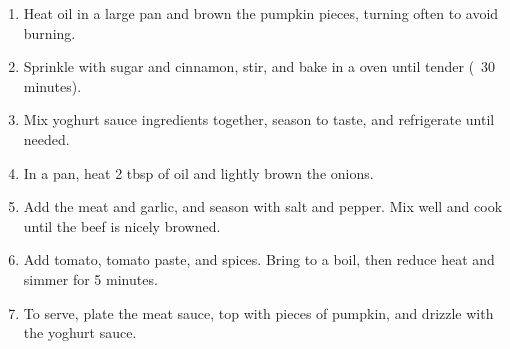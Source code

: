\begin{enumerate}
    \item Heat oil in a large pan and brown the pumpkin pieces, turning often to avoid burning.
    \item Sprinkle with sugar and cinnamon, stir, and bake in a  oven until tender (~30 minutes).
    \item Mix yoghurt sauce ingredients together, season to taste, and refrigerate until needed.
    \item In a pan, heat 2 tbsp of oil and lightly brown the onions.
    \item Add the meat and garlic, and season with salt and pepper. Mix well and cook until the beef is nicely browned.
    \item Add tomato, tomato paste, and spices. Bring to a boil, then reduce heat and simmer for 5 minutes.
    \item To serve, plate the meat sauce, top with pieces of pumpkin, and drizzle with the yoghurt sauce.
\end{enumerate}
